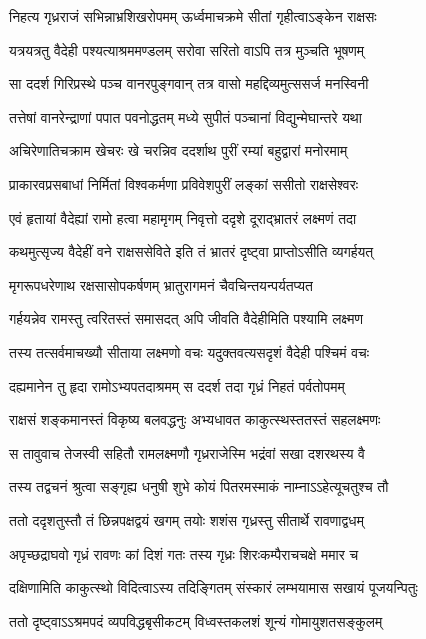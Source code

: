 \twolineshloka
{निहत्य गृध्रराजं सभिन्नाभ्रशिखरोपमम्}
{ऊर्ध्वमाचक्रमे सीतां गृहीत्वाऽङ्केन राक्षसः}


\twolineshloka
{यत्रयत्रतु वैदेही पश्यत्याश्रममण्डलम्}
{सरोवा सरितो वाऽपि तत्र मुञ्चति भूषणम्}


\twolineshloka
{सा ददर्श गिरिप्रस्थे पञ्च वानरपुङ्गवान्}
{तत्र वासो महद्दिव्यमुत्ससर्ज मनस्विनी}


\twolineshloka
{तत्तेषां वानरेन्द्राणां पपात पवनोद्धतम्}
{मध्ये सुपीतं पञ्चानां विद्युन्मेघान्तरे यथा}


\twolineshloka
{अचिरेणातिचक्राम खेचरः खे चरन्निव}
{ददर्शाथ पुरीं रम्यां बहुद्वारां मनोरमाम्}


\twolineshloka
{प्राकारवप्रसबाधां निर्मितां विश्वकर्मणा}
{प्रविवेशपुरीं लङ्कां ससीतो राक्षसेश्वरः}


\twolineshloka
{एवं हृतायां वैदेह्यां रामो हत्वा महामृगम्}
{निवृत्तो ददृशे दूराद्भ्रातरं लक्ष्मणं तदा}


\twolineshloka
{कथमुत्सृज्य वैदेहीं वने राक्षससेविते}
{इति तं भ्रातरं दृष्ट्वा प्राप्तोऽसीति व्यगर्हयत्}


\twolineshloka
{मृगरूपधरेणाथ रक्षसासोपकर्षणम्}
{भ्रातुरागमनं चैवचिन्तयन्पर्यतप्यत}


\twolineshloka
{गर्हयन्नेव रामस्तु त्वरितस्तं समासदत्}
{अपि जीवति वैदेहीमिति पश्यामि लक्ष्मण}


\twolineshloka
{तस्य तत्सर्वमाचख्यौ सीताया लक्ष्मणो वचः}
{यदुक्तवत्यसदृशं वैदेही पश्चिमं वचः}


\twolineshloka
{दह्यमानेन तु हृदा रामोऽभ्यपतदाश्रमम्}
{स ददर्श तदा गृध्रं निहतं पर्वतोपमम्}


\twolineshloka
{राक्षसं शङ्कमानस्तं विकृष्य बलवद्धनुः}
{अभ्यधावत काकुत्स्थस्ततस्तं सहलक्ष्मणः}


\twolineshloka
{स तावुवाच तेजस्वी सहितौ रामलक्ष्मणौ}
{गृध्रराजेस्मि भद्रंवां सखा दशरथस्य वै}


\twolineshloka
{तस्य तद्वचनं श्रुत्वा सङ्गृह्य धनुषी शुभे}
{कोयं पितरमस्माकं नाम्नाऽऽहेत्यूचतुश्च तौ}


\twolineshloka
{ततो ददृशतुस्तौ तं छिन्नपक्षद्वयं खगम्}
{तयोः शशंस गृध्रस्तु सीतार्थे रावणाद्वधम्}


\twolineshloka
{अपृच्छद्राघवो गृध्रं रावणः कां दिशं गतः}
{तस्य गृध्रः शिरःकम्पैराचचक्षे ममार च}


\twolineshloka
{दक्षिणामिति काकुत्स्थो विदित्वाऽस्य तदिङ्गितम्}
{संस्कारं लम्भयामास सखायं पूजयन्पितुः}


\twolineshloka
{ततो दृष्ट्वाऽऽश्रमपदं व्यपविद्धबृसीकटम्}
{विध्वस्तकलशं शून्यं गोमायुशतसङ्कुलम्}


